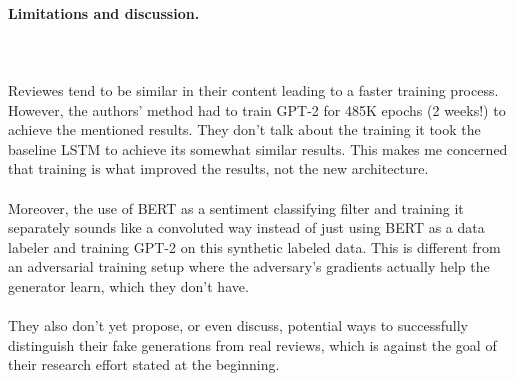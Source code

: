 \documentclass{article}
\begin{document}
\paragraph{Limitations and discussion.} $ $
\\\\ Reviewes tend to be similar in their content leading to a faster training process. However,  the authors' method had to train GPT-2 for 485K epochs (2 weeks!) to achieve the mentioned results. They don't talk about the training it took the baseline LSTM to achieve its somewhat similar results. This makes me concerned that training is what improved the results, not the new architecture. 
\\\\ Moreover, the use of BERT as a sentiment classifying filter and training it separately sounds like a convoluted way instead of just using BERT as a data labeler and training GPT-2 on this synthetic labeled data. This is different from an adversarial training setup where the adversary's gradients actually help the generator learn, which they don't have.
\\\\ They also don't yet propose, or even discuss, potential ways to successfully distinguish their fake generations from real reviews, which is against the goal of their research effort stated at the beginning. 
\end{document}
